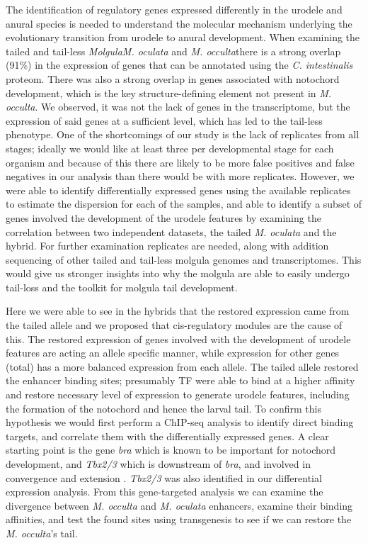 The identification of regulatory genes expressed differently in the urodele and anural species is needed to understand the molecular mechanism underlying the evolutionary transition from urodele to anural development. When examining the tailed and tail-less \textit{Molgula}\textemdash \textit{M. oculata} and \textit{M. occulta}\textemdash there is a strong overlap (91\%) in the expression of genes that can be annotated using the \textit{C. intestinalis} proteom. There was also a strong overlap in genes associated with notochord development, which is the key structure-defining element not present in \textit{M. occulta}. We observed, it was not the lack of genes in the transcriptome, but the expression of said genes at a sufficient level, which has led to the tail-less phenotype. One of the shortcomings of our study is the lack of replicates from all stages; ideally we would like at least three per developmental stage for each organism and because of this there are likely to be more false positives and false negatives in our analysis than there would be with more replicates. However, we were able to identify differentially expressed genes using the available replicates to estimate the dispersion for each of the samples, and able to identify a subset of genes involved the development of the urodele features by examining the correlation between two independent datasets, the tailed \textit{M. oculata} and the hybrid. For further examination replicates are needed, along with addition sequencing of other tailed and tail-less molgula genomes and transcriptomes. This would give us stronger insights into why the molgula are able to easily undergo tail-loss and the toolkit for molgula tail development. 

Here we were able to see in the hybrids that the restored expression came from the tailed allele and we proposed that cis-regulatory modules are the cause of this. The restored expression of genes involved with the development of urodele features are acting an allele specific manner, while expression for other genes (total) has a more balanced expression from each allele. The tailed allele restored the enhancer binding sites; presumably TF were able to bind at a higher affinity and restore necessary level of expression to generate urodele features, including the formation of the notochord and hence the larval tail. To confirm this hypothesis we would first perform a ChIP-seq analysis to identify direct binding targets, and correlate them with the differentially expressed genes. A clear starting point is the gene \textit{bra} which is known to be important for notochord development, and \textit{Tbx2/3} which is downstream of \textit{bra}, and involved in convergence and extension \cite{katikala_functional_2013}.  {\em Tbx2/3} was also identified in our differential expression analysis. From this gene-targeted analysis we can examine the divergence between \textit{M. occulta} and \textit{M. oculata} enhancers, examine their binding affinities, and test the found sites using transgenesis to see if we can restore the \textit{M. occulta}'s tail.

